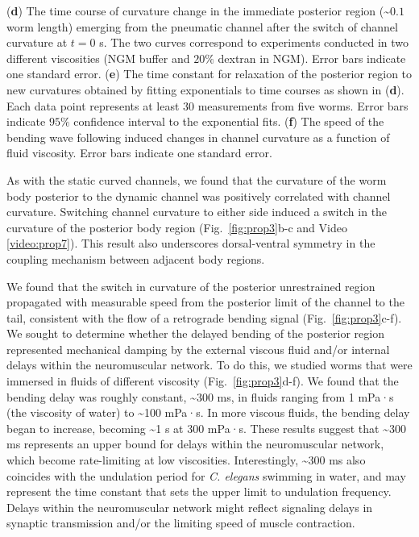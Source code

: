\begin{FPfigure}
{(\textbf{d}) The time course of curvature change in the immediate posterior region (\textasciitilde$0.1$ worm length) 
emerging from the pneumatic channel after the switch of channel curvature at $t = 0$ s. The two 
curves correspond to experiments conducted in two different viscosities (NGM buffer and $20\%$ 
dextran in NGM). Error bars indicate one standard error.  
(\textbf{e}) The time constant for relaxation of the posterior region to new curvatures obtained by fitting 
exponentials to time courses as shown in (\textbf{d}). Each data point represents at least $30$ 
measurements from five worms. Error bars indicate $95\%$ confidence interval to the exponential 
fits.  
(\textbf{f}) The speed of the bending wave following induced changes in channel curvature as a function 
of fluid viscosity. Error bars indicate one standard error.\label{fig:prop3}}
\end{FPfigure}


As with the static curved channels, we found that the curvature of the worm body posterior to the 
dynamic channel was positively correlated with channel curvature. Switching channel curvature 
to either side induced a switch in the curvature of the posterior body region (Fig.~\ref{fig:prop3}b-c and 
Video  \ref{video:prop7}). This result also underscores dorsal-ventral symmetry in the coupling 
mechanism between adjacent body regions. 

We found that the switch in curvature of the posterior unrestrained region propagated with 
measurable speed from the posterior limit of the channel to the tail, consistent with the flow of a 
retrograde bending signal (Fig.~\ref{fig:prop3}c-f). We sought to determine whether the delayed bending of the 
posterior region represented mechanical damping by the external viscous fluid and/or internal 
delays within the neuromuscular network. To do this, we studied worms that were immersed in 
fluids of different viscosity (Fig.~\ref{fig:prop3}d-f). We found that the bending delay was roughly constant, 
\textasciitilde300 ms, in fluids ranging from 1 mPa·s (the viscosity of water) to \textasciitilde100 mPa·s. In more viscous 
fluids, the bending delay began to increase, becoming \textasciitilde1 s at $300$ mPa·s. These results suggest 
that \textasciitilde300 ms represents an upper bound for delays within the neuromuscular network, which 
become rate-limiting at low viscosities. Interestingly, \textasciitilde300 ms also coincides with the undulation 
period for \textit{C. elegans} swimming in water, and may represent the time constant that sets the 
upper limit to undulation frequency. Delays within the neuromuscular network might reflect 
signaling delays in synaptic transmission and/or the limiting speed of muscle contraction.

